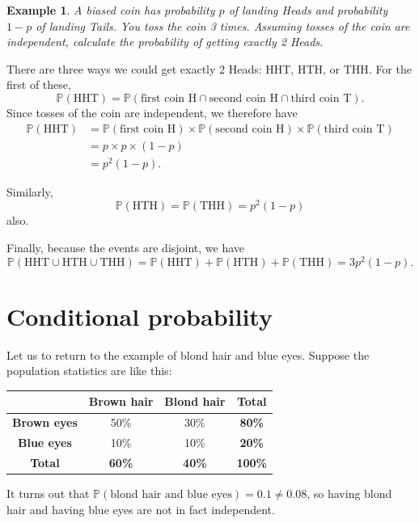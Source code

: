 \documentclass[
  a4paper,
]{book}
\theoremstyle{definition}
\theoremstyle{definition}
\newtheorem{example}{Example}[chapter]
\theoremstyle{definition}
\theoremstyle{definition}
\theoremstyle{remark}
\begin{document}
\begin{example}
\emph{A biased coin has probability \(p\) of landing Heads and probability \(1-p\) of landing Tails. You toss the coin 3 times. Assuming tosses of the coin are independent, calculate the probability of getting exactly 2 Heads.}

There are three ways we could get exactly 2 Heads: HHT, HTH, or THH. For the first of these,
\[ \mathbb P(\text{HHT}) = \mathbb P(\text{first coin H} \cap \text{second coin H} \cap \text{third coin T}) . \]
Since tosses of the coin are independent, we therefore have
\begin{align*}
\mathbb P(\text{HHT})
  &= \mathbb P(\text{first coin H}) \times \mathbb P ( \text{second coin H} )\times \mathbb P(\text{third coin T}) \\
  &=p \times p \times (1-p) \\
  &= p^2(1-p).
\end{align*}

Similarly,
\[ \mathbb P(\text{HTH}) = \mathbb P(\text{THH}) = p^2(1-p) \]
also.

Finally, because the events are disjoint, we have
\[ \mathbb P(\text{HHT} \cup\text{HTH} \cup \text{THH}) = \mathbb P(\text{HHT} ) + \mathbb P(\text{HTH}) + \mathbb P(\text{THH}) = 3p^2(1-p) . \]
\end{example}

\hypertarget{conditional}{%
\section{Conditional probability}\label{conditional}}

Let us to return to the example of blond hair and blue eyes. Suppose the population statistics are like this:

\begin{longtable}[]{@{}cccc@{}}
\toprule()
& \textbf{Brown hair} & \textbf{Blond hair} & \textbf{Total} \\
\midrule()
\endhead
\textbf{Brown eyes} & 50\% & 30\% & \textbf{80\%} \\
\textbf{Blue eyes} & 10\% & 10\% & \textbf{20\%} \\
\textbf{Total} & \textbf{60\%} & \textbf{40\%} & \textbf{100\%} \\
\bottomrule()
\end{longtable}

It turns out that \(\mathbb P(\text{blond hair and blue eyes}) = 0.1 \neq 0.08\), so having blond hair and having blue eyes are not in fact independent.
\end{document}

